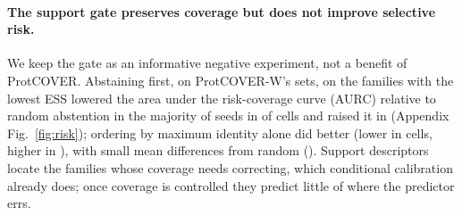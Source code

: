 \paragraph{The support gate preserves coverage but does not improve selective risk.}
We keep the gate as an informative negative experiment, not a benefit of ProtCOVER. Abstaining first, on ProtCOVER-W's sets, on the families with the lowest ESS lowered the area under the risk-coverage curve (AURC) relative to random abstention in the majority of seeds in \riskEssNBetter{} of \riskNCells{} cells and raised it in \riskEssNWorse{} (Appendix Fig.~\ref{fig:risk}); ordering by maximum identity alone did better (lower in \riskSupportNBetter{} cells, higher in \riskSupportNWorse{}), with small mean differences from random (\riskSupportDiffRange{}). Support descriptors locate the families whose coverage needs correcting, which conditional calibration already does; once coverage is controlled they predict little of where the predictor errs.

